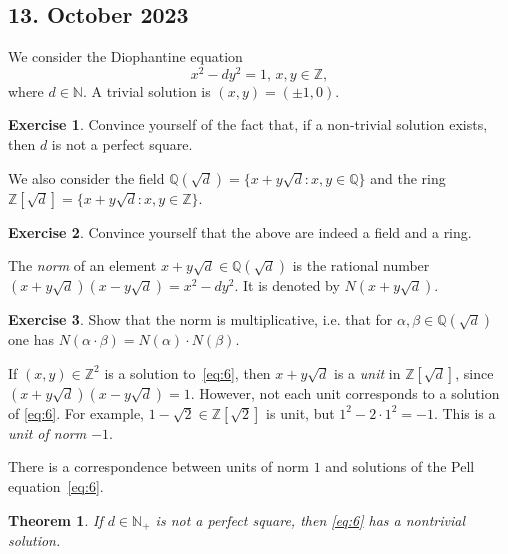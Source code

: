 \documentclass[a4paper,11pt,american]{article}
\newcommand{\N}{\mathbb{N}}
\newcommand{\Q}{\mathbb{Q}}
\newcommand{\Z}{\mathbb{Z}}
\theoremstyle{plain}
\newtheorem{theorem}{Theorem}
\theoremstyle{definition}
\newtheorem{exercise}{Exercise}
\begin{document}
\subsection*{13. October 2023}

We consider the Diophantine equation
\begin{equation}
  \label{eq:6}
  x^2 - dy^2  = 1, \, x,y \in \Z,
\end{equation}
where $d \in\N $. A trivial solution is $(x,y) = (\pm 1, 0)$.
\begin{exercise}
  \label{exe:1}
  Convince yourself of the fact that, if a non-trivial solution exists, then $d$ is not a perfect square. 
\end{exercise}

We also consider the field $\Q(\sqrt{d}) = \{x+y\sqrt{d}:x,y\in\Q \}$ and  the ring $\Z[ \sqrt{d}] = \{ x+ y \sqrt{d}:x,y \in\Z\}$.
\begin{exercise}
  \label{exe:2}
  Convince yourself that the above are indeed a field and a ring. 
\end{exercise}




The \emph{norm} of an element $x + y \sqrt{d} \in \Q(\sqrt{d})$ is the rational number $(x + y \sqrt{d}) (x - y \sqrt{d} ) = x^2 -d y^2$. It is denoted by $N(x+y\sqrt{d})$. 
\begin{exercise}
  \label{exe:3}
  Show that the norm is multiplicative, i.e. that for $\alpha,\beta \in\Q(\sqrt{d})$ one has $N(\alpha\cdot\beta) = N(\alpha)\cdot N(\beta)$. 
\end{exercise}


If $(x,y) \in\Z^2$ is a solution to~\eqref{eq:6}, then $x + y \sqrt{d}$ is a \emph{unit} in $\Z[ \sqrt{d}]$, since $(x + y \sqrt{d})(x - y \sqrt{d}) =1$. However, not each unit corresponds to a solution of \eqref{eq:6}. For example, $1 - \sqrt{2} \in\Z[\sqrt{2}]$ is  unit, but $1^2 - 2 \cdot 1^2 = -1$. This is a \emph{unit of norm $-1$}.

There is a correspondence between units of norm $1$ and solutions of the Pell equation~\eqref{eq:6}. 



\begin{theorem}
  \label{thr:4}
  If $d \in\N_+$ is not a perfect square, then \eqref{eq:6} has a nontrivial solution. 
\end{theorem}
\end{document}

